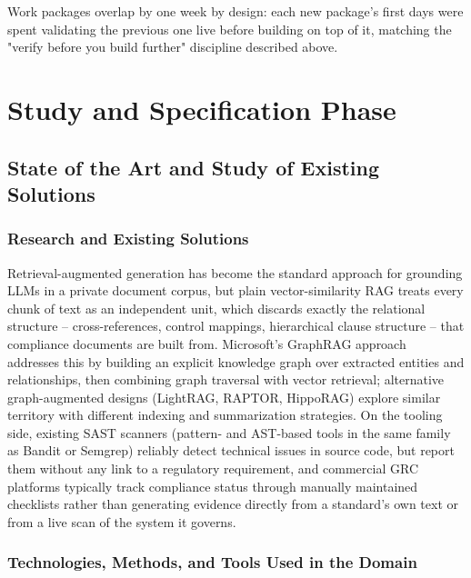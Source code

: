 \documentclass[12pt,a4paper]{report}
\begin{document}
Work packages overlap by one week by design: each new package's first days
were spent validating the previous one live before building on top of it,
matching the "verify before you build further" discipline described above.

\chapter{Study and Specification Phase}

\section{State of the Art and Study of Existing Solutions}

\subsection{Research and Existing Solutions}

Retrieval-augmented generation has become the standard approach for
grounding \acp{LLM} in a private document corpus, but plain vector-similarity
\ac{RAG} treats every chunk of text as an independent unit, which discards
exactly the relational structure -- cross-references, control mappings,
hierarchical clause structure -- that compliance documents are built from.
Microsoft's GraphRAG approach~\cite{edge2024graphrag} addresses this by
building an explicit knowledge graph over extracted entities and
relationships, then combining graph traversal with vector retrieval;
alternative graph-augmented designs (LightRAG, RAPTOR, HippoRAG) explore
similar territory with different indexing and summarization strategies. On
the tooling side, existing \ac{SAST} scanners (pattern- and \ac{AST}-based
tools in the same family as Bandit or Semgrep) reliably detect technical
issues in source code, but report them without any link to a regulatory
requirement, and commercial \ac{GRC} platforms typically track compliance
status through manually maintained checklists rather than generating
evidence directly from a standard's own text or from a live scan of the
system it governs.

\subsection{Technologies, Methods, and Tools Used in the Domain}
\end{document}
